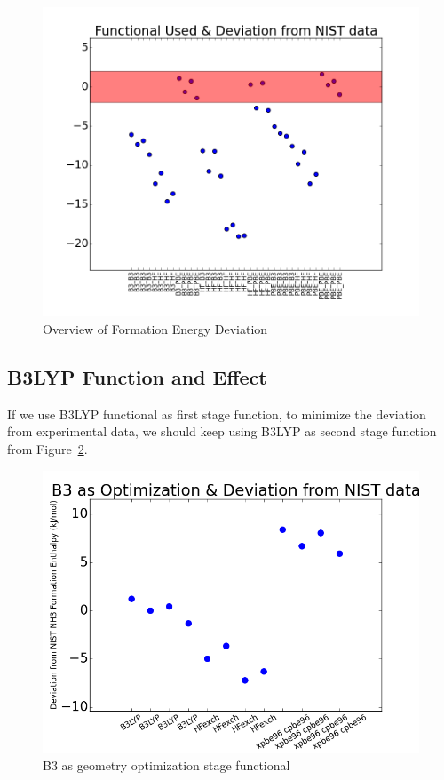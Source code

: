 \documentclass{article}
\begin{document}
\begin{figure}[ht]
\includegraphics[width=1\textwidth]{Functional_used_Devi_overview.png}
\caption{Overview of Formation Energy Deviation}
\label{fig:overviewdev}
\end{figure} 


\subsection{B3LYP Function and Effect}
If we use B3LYP functional as first stage function, to minimize the deviation from experimental data, we should keep using B3LYP as second stage function from Figure~\ref{fig:B3}. 
\begin{figure}[ht]
\includegraphics[width=1\textwidth]{B3LYP_Functional_1_Dev.png}
\caption{B3 as geometry optimization stage functional}
\label{fig:B3}
\end{figure} 
\end{document}
